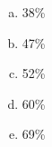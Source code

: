 \documentclass[a4paper,14pt]{article}
\begin{document}
\begin{multicols}{2}
\begin{enumerate}
			\begin{enumerate}[a)]
				\item 38\%
				\item 47\%
				\item 52\%
				\item 60\%
				\item 69\%
			\end{enumerate}
		\end{enumerate}
		$~$ \\ $~$ \\ $~$ \\ $~$ \\ $~$ \\ $~$ \\ $~$ \\ $~$ \\ $~$ \\ $~$
	\end{multicols}
\end{document}

